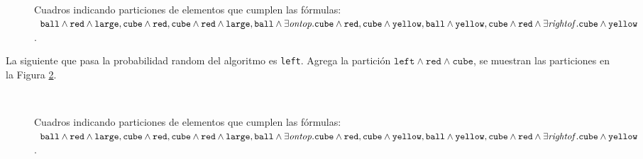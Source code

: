 \begin{figure}[ht]
\begin{center}
\\[0pt]
\caption{Cuadros indicando particiones de elementos que cumplen las f\'ormulas: $\texttt{ball} \wedge \texttt{red} \wedge \texttt{large},\texttt{cube} \wedge \texttt{red}, \texttt{cube} \wedge \texttt{red} \wedge \texttt{large},\texttt{ball} \wedge \exists \mathit{ontop}. \texttt{cube} \wedge \texttt{red}, \texttt{cube} \wedge \texttt{yellow}, \texttt{ball} \wedge \texttt{yellow}, \texttt{cube} \wedge \texttt{red} \wedge \exists \mathit{rightof}. \texttt{cube} \wedge \texttt{yellow}$.}
\label{fig-modelo9e}
\end{center}
\end{figure}

La siguiente que pasa la probabilidad random del algoritmo es \texttt{left}. Agrega la partici\'on $\texttt{left} \wedge \texttt{red}\wedge \texttt{cube}$, se muestran las particiones en la Figura \ref{fig-modelo9f}.

\begin{figure}[ht]
\begin{center}
\\[0pt]
\caption{Cuadros indicando particiones de elementos que cumplen las f\'ormulas: $\texttt{ball} \wedge \texttt{red} \wedge \texttt{large},\texttt{cube} \wedge \texttt{red}, \texttt{cube} \wedge \texttt{red} \wedge \texttt{large},\texttt{ball} \wedge \exists \mathit{ontop}. \texttt{cube} \wedge \texttt{red}, \texttt{cube} \wedge \texttt{yellow}, \texttt{ball} \wedge \texttt{yellow}, \texttt{cube} \wedge \texttt{red} \wedge \exists \mathit{rightof}. \texttt{cube} \wedge \texttt{yellow}$.}
\label{fig-modelo9f}
\end{center}
\end{figure}

